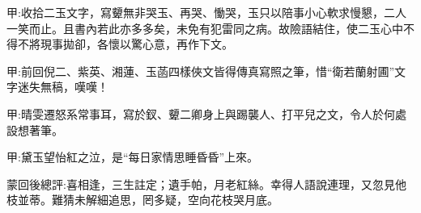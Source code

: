 \begin{parag}
    \begin{note}甲:收拾二玉文字，寫顰無非哭玉、再哭、慟哭，玉只以陪事小心軟求慢懇，二人一笑而止。且書內若此亦多多矣，未免有犯雷同之病。故險語結住，使二玉心中不得不將現事拋卻，各懷以驚心意，再作下文。\end{note}
\end{parag}


\begin{parag}
    \begin{note}甲:前回倪二、紫英、湘蓮、玉菡四樣俠文皆得傳真寫照之筆，惜“衛若蘭射圃”文字迷失無稿，嘆嘆！\end{note}
\end{parag}


\begin{parag}
    \begin{note}甲:晴雯遷怒系常事耳，寫於釵、顰二卿身上與踢襲人、打平兒之文，令人於何處設想著筆。\end{note}
\end{parag}


\begin{parag}
    \begin{note}甲:黛玉望怡紅之泣，是“每日家情思睡昏昏”上來。\end{note}
\end{parag}


\begin{parag}
    \begin{note}蒙回後總評:喜相逢，三生註定；遺手帕，月老紅絲。幸得人語說連理，又忽見他枝並蒂。難猜未解細追思，罔多疑，空向花枝哭月底。\end{note}
\end{parag}

